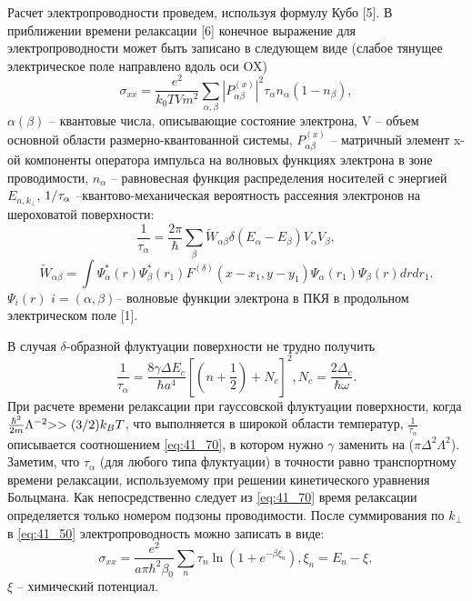 Расчет электропроводности проведем, используя формулу Кубо [5]. В приближении времени релаксации [6] конечное выражение для электропроводности может быть записано в следующем виде (слабое тянущее электрическое поле направлено вдоль оси OX)
\begin{equation} \label{eq:41_50}
\sigma _{xx} =\frac{e^{2} }{k_{0} TVm^{2} } \sum _{\alpha ,\beta }\left|P_{\alpha \beta }^{\left(x\right)} \right|^{2} \tau _{\alpha } n_{\alpha } \left(1-n_{\beta } \right) ,
\end{equation} 
$\alpha (\beta )$ -- квантовые числа, описывающие состояние электрона, V -- объем основной области размерно-квантованной системы, $P_{\alpha \beta }^{\left(x\right)} $ -- матричный элемент x-ой компоненты оператора импульса на волновых функциях электрона в зоне проводимости, $n_{\alpha } $ -- равновесная функция распределения носителей с энергией $E_{n,k_{\bot } } $, ${1 \mathord{\left/{\vphantom{1 \tau _{\alpha } }}\right.\kern-\nulldelimiterspace} \tau _{\alpha } } $ --квантово-механическая вероятность рассеяния электронов на шероховатой поверхности:
\begin{equation} \label{eq:41_60}
\frac{1}{\tau _{\alpha } } =\frac{2\pi }{\hbar } \sum _{\beta }\tilde{W}_{\alpha \beta } \delta \left(E_{\alpha } -E_{\beta } \right) V_{\alpha } V_{\beta } ,
\end{equation}  
\[
\tilde{W}_{\alpha \beta } =\int \Psi _{\alpha }^{*} \left(r\right)\Psi _{\beta }^{*} \left(r_{1} \right)F^{(\delta )} \left(x-x_{1} ,y-y_{1} \right)\Psi _{\alpha } \left(r_{1} \right)\Psi _{\beta } \left(r\right)drdr_{1}  .
\] 
$\Psi _{i} \left(r\right)$ $i=(\alpha ,\beta )$-- волновые функции электрона в ПКЯ в продольном электрическом поле [1].

В случая $\delta $-образной флуктуации поверхности не трудно получить
\begin{equation} \label{eq:41_70}
\frac{1}{\tau _{\alpha } } =\frac{8\gamma \Delta E_{c} }{\hbar a^{4} } \left[\left(n+\frac{1}{2} \right)+N_{c} \right]^{2} , N_{c} =\frac{2\Delta _{c} }{\hbar \omega } .
\end{equation}  
При расчете времени релаксации при гауссовской флуктуации поверхности, когда $\frac{\hbar ^{2} }{2m} \Lambda ^{-2} {>>(3 \mathord{\left/{\vphantom{>>(3 2}}\right.\kern-\nulldelimiterspace} 2} )k_{B} T$, что выполняется в широкой области температур, $\frac{1}{\tau _{\alpha } } $ описывается соотношением \eqref{eq:41_70}, в котором нужно $\gamma $ заменить на ($\pi \Delta ^{2} \Lambda ^{2} $). Заметим, что $\tau _{\alpha } $ (для любого типа флуктуации) в точности равно транспортному времени релаксации, используемому при решении кинетического уравнения Больцмана. Как непосредственно следует из \eqref{eq:41_70} время релаксации определяется только номером подзоны проводимости. После суммирования по $k_{\bot } $ в \eqref{eq:41_50} электропроводность можно записать в виде:
\begin{equation} \label{eq:41_80}
\sigma _{xx} =\frac{e^{2} }{a\pi \hbar ^{2} \beta _{0} } \sum _{n}\tau _{n} \ln \left(1+e^{-\beta \xi _{n} } \right) , \xi _{n} =E_{n} -\xi ,
\end{equation}
$\xi $ -- химический потенциал.

